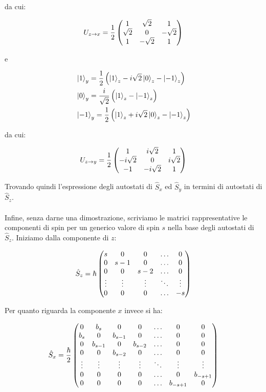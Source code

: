 	da cui:
	
\begin{align*}
	U_{z \to x} = \frac{1}{2} \, \mqty( 1 & \sqrt{2} & 1 \\ \sqrt{2} & 0 & - \sqrt{2} \\ 1 & -\sqrt{2} & 1)    
\end{align*}

	e
	
\begin{align*}
	& \ket{1}_y = \frac{1}{2} \, \qty\Big( \ket{1}_z - i \sqrt{2} \ket{0}_z - \ket{-1}_z) \\
	& \ket{0}_y = \frac{i}{\sqrt{2}} \, \qty\Big( \ket{1}_z - \ket{-1}_z) \\
	& \ket{-1}_y = \frac{1}{2} \, \qty\Big( \ket{1}_z + i \sqrt{2} \ket{0}_z - \ket{-1}_z ) \\
\end{align*}

	da cui:

\begin{align*}
	U_{z \to y} = \frac{1}{2} \, \mqty( 1 & i\sqrt{2} & 1 \\ -i\sqrt{2} & 0 & i\sqrt{2} \\ -1 & -i\sqrt{2} & 1)    
\end{align*}
	
	Trovando quindi l'espressione degli autostati di $\hat{S}_x$ ed $\hat{S}_y$ in termini di autostati di $\hat{S}_z$.
	\\
	\\
	Infine, senza darne una dimostrazione, scriviamo le matrici rappresentative le componenti di spin per un generico valore di spin $s$ nella base degli autostati di $\hat{S}_z$. Iniziamo dalla componente di $z$:

\begin{align*}	
	\hat{S}_z = \hbar \, \mqty(  s & 0 & 0 & \ldots & 0  \\ 0 & s-1 & 0 & \ldots & 0 \\ 0 & 0 & s-2 & \ldots & 0 \\ \vdots & \vdots & \vdots & \ddots & \vdots \\ 0 & 0 & 0 & \ldots & -s    )
\end{align*}

	Per quanto riguarda la componente $x$ invece si ha:
	
\begin{align*}
	\hat{S}_x = \frac{\hbar}{2} \, \mqty( 0 & b_s & 0 & 0 & \ldots & 0 & 0 \\ b_s & 0 & b_{s-1} & 0 & \ldots & 0 & 0 \\ 0 & b_{s-1} & 0 & b_{s-2} & \ldots & 0 & 0 \\ 0 & 0 & b_{s-2} &  0 & \ldots & 0 & 0 \\ \vdots & \vdots & \vdots & \vdots & \ddots & \vdots & \vdots \\ 0 & 0 & 0 & 0 & \ldots & 0 & b_{-s +1} \\ 0 & 0 & 0 & 0 & \ldots & b_{-s+ 1} & 0)
\end{align*}

